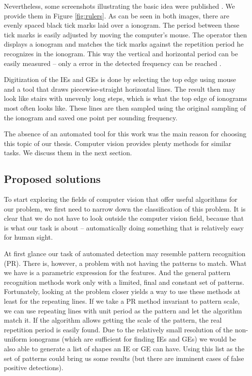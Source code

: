 Nevertheless, some screenshots illustrating the basic idea were published \citep{Duru2008, Akalin2010}. We provide them in Figure \ref{fig:rulers}. As can be seen in both images, there are evenly spaced black tick marks laid over a ionogram. The period between these tick marks is easily adjusted by moving the computer's mouse. The operator then displays a ionogram and matches the tick marks against the repetition period he recognizes in the ionogram. This way the vertical and horizontal period can be easily measured -- only a  error in the detected frequency can be reached \citep[p.~2]{Duru2008}.

Digitization of the IEs and GEs is done by selecting the top edge using mouse and a tool that draws piecewise-straight horizontal lines. The result then may look like stairs with unevenly long steps, which is what the top edge of ionograms most often looks like. These lines are then sampled using the original sampling of the ionogram and saved one point per sounding frequency.

The absence of an automated tool for this work was the main reason for choosing this topic of our thesis. Computer vision provides plenty methods for similar tasks. We discuss them in the next section.

\subsection{Proposed solutions}
To start exploring the fields of computer vision that offer useful algorithms for our problem, we first need to narrow down the classification of this problem. It is clear that we do not have to look outside the computer vision field, because that is what our task is about -- automatically doing something that is relatively easy for human sight. 

At first glance our task of automated detection may resemble pattern recognition (PR). There is, however, a problem with not having the patterns to match. What we have is a parametric expression for the features. And the general pattern recognition methods work only with a limited, final and constant set of patterns. Fortunately, looking at the problem closer yields a way to use these methods at least for the repeating lines. If we take a PR method invariant to pattern scale, we can use repeating lines with unit period as the pattern and let the algorithm match it. If the algorithm allows getting the scale of the pattern, the real repetition period is easily found. Due to the relatively small resolution of the non-uniform ionograms (which are sufficient for finding IEs and GEs) we would be also able to generate a list of shapes an IE or GE can have. Using this list as the set of patterns could bring us some results (but there are imminent cases of false positive detections). 

